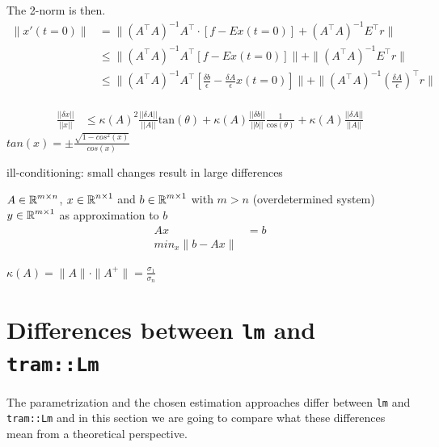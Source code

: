 \documentclass[11pt,a4paper,twoside]{book}\usepackage[]{graphicx}\usepackage[]{xcolor}
\begin{document}
{The 2-norm is then.
\begin{align*}
\|x'(t=0)\|&=\|\left(A^\top A\right)^{-1}A^\top \cdot \left[f-E x(t=0)\right]+\left(A^\top A\right)^{-1} E^\top r\|\\
&\leq \|\left(A^\top A\right)^{-1}A^\top\left[f-E x(t=0)\right]\|+\|\left(A^\top A\right)^{-1} E^\top r\|\\
&\leq \|\left(A^\top A\right)^{-1}A^\top\left[\frac{\delta b}{\epsilon}-\frac{\delta A}{\epsilon} x(t=0)\right]\|+\|\left(A^\top A\right)^{-1} \left(\frac{\delta A}{\epsilon}\right)^\top r\|\\
\end{align*}


\begin{align}
\frac{||\delta x||}{||x||}&\leq\kappa(A)^2\frac{||\delta A||}{||A||}\text{tan}(\theta)+\kappa(A)\frac{||\delta b||}{||b||}\frac{1}{\text{cos}(\theta)}+\kappa(A)\frac{||\delta A||}{||A||}
\end{align}
$tan(x)=\pm \frac{\sqrt{1-cos^2(x)}}{cos(x)}$

\color{black}
ill-conditioning: small changes result in large differences

$A\in \operatorname{\mathbb{R}}^{m\times n}$, $x\in \operatorname{\mathbb{R}}^{ n\times 1}$ and $b\in \operatorname{\mathbb{R}}^{ m\times 1}$ with $m>n$ (overdetermined system) $y\in \operatorname{\mathbb{R}}^{ m\times 1}$ as approximation to $b$
\begin{align}
Ax &= b\\
min_x\|b-Ax\|
\end{align}

$\kappa(A)=\|A\|\cdot \|A^+\|=\frac{\sigma_1}{\sigma_n}$
}

\section{Differences between \texttt{lm} and \texttt{tram::Lm}}

The parametrization and the chosen estimation approaches differ between \texttt{lm} and 
\texttt{tram::Lm} and in this section we are going to compare what these differences mean from a theoretical perspective.

\end{document}
